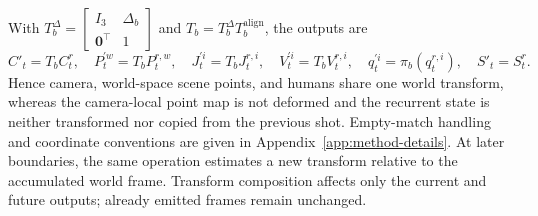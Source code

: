With $T_b^\Delta=\begin{bmatrix}I_3&\Delta_b\\\mathbf 0^\top&1\end{bmatrix}$
and $T_b=T_b^\Delta T_b^{\mathrm{align}}$, the outputs are
\begin{equation}
 C'_t=T_bC_t^r,\quad P_t^{\prime w}=T_bP_t^{r,w},\quad
 J_t^{\prime i}=T_bJ_t^{r,i},\quad V_t^{\prime i}=T_bV_t^{r,i},\quad
 q_t^{\prime i}=\pi_b(q_t^{r,i}),\quad S'_t=S_t^r.
 \label{eq:shared-world-transform}
\end{equation}
Hence camera, world-space scene points, and humans share one world transform,
whereas the camera-local point map is not deformed and the recurrent state is
neither transformed nor copied from the previous shot. Empty-match handling
and coordinate conventions are given in Appendix~\ref{app:method-details}.
At later boundaries, the same operation estimates a new transform relative to
the accumulated world frame. Transform composition affects only the current
and future outputs; already emitted frames remain unchanged.
